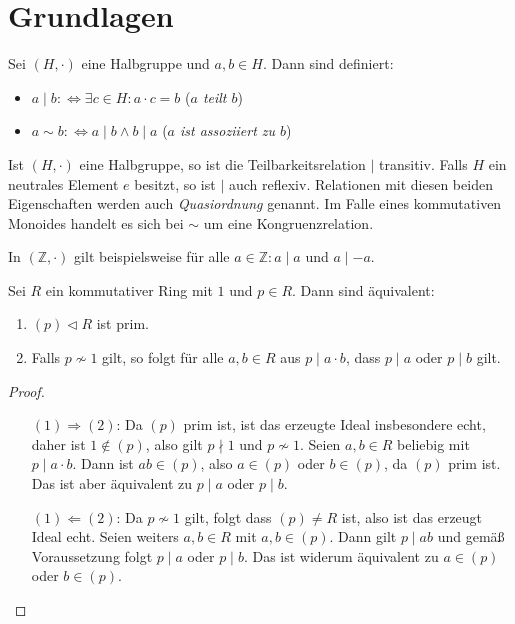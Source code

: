 \section{Grundlagen}

\begin{definition}
    Sei $(H,\cdot)$ eine Halbgruppe und $a,b\in H$. Dann sind definiert:
    \begin{itemize}
        \item $a\mid b:\Leftrightarrow \exists c\in H:a\cdot c=b$ \tab (\emph{$a$ teilt $b$})
        \item $a\sim b:\Leftrightarrow a\mid b\land b\mid a$ \tab (\emph{$a$ ist assoziiert zu $b$})
    \end{itemize}
\end{definition}

\begin{remark}
    Ist $(H,\cdot)$ eine Halbgruppe, so ist die Teilbarkeitsrelation $\mid$ transitiv.
    Falls $H$ ein neutrales Element $e$ besitzt, so ist $\mid$ auch reflexiv. Relationen mit diesen beiden Eigenschaften
    werden auch \emph{Quasiordnung} genannt. Im Falle eines kommutativen Monoides handelt es sich bei
    $\sim$ um eine Kongruenzrelation.
\end{remark}

\begin{example}
    In $(\mathbb{Z},\cdot)$ gilt beispielsweise für alle $a\in\mathbb{Z}:a\mid a$ und $a\mid -a$. 
\end{example}

\begin{proposition}
    Sei $R$ ein kommutativer Ring mit $1$ und $p\in R$. Dann sind äquivalent:
    \begin{enumerate}
        \item $(p)\vartriangleleft R$ ist prim.
        \item Falls $p\not\sim 1$ gilt, so folgt für alle $a,b\in R$
        aus $p\mid a\cdot b$, dass $p\mid a$ oder $p\mid b$ gilt.
    \end{enumerate}
\end{proposition}

\begin{proof}{\ }
    \begin{itemize}[leftmargin=2.5cm] 
        \item[$(1) \Rightarrow (2)$:]Da $(p)$ prim ist, ist das erzeugte Ideal insbesondere echt, daher ist $1\not\in (p)$, also gilt $p \nmid 1$ und $p\not\sim 1$.
        Seien $a,b\in R$ beliebig mit $p\mid a\cdot b$. Dann ist $ab\in (p)$, also $a\in(p)$ oder $b\in(p)$, da $(p)$ prim ist.
        Das ist aber äquivalent zu $p\mid a$ oder $p\mid b$.
        \item[$(1) \Leftarrow (2)$:]Da $p\not\sim 1$ gilt, folgt dass $(p)\neq R$ ist, also ist das erzeugt Ideal echt.
        Seien weiters $a,b\in R$ mit $a,b\in (p)$. Dann gilt $p\mid ab$ und gemäß Voraussetzung folgt $p\mid a$ oder $p\mid b$.
        Das ist widerum äquivalent zu $a\in(p)$ oder $b\in(p)$.
    \end{itemize}
\end{proof}

